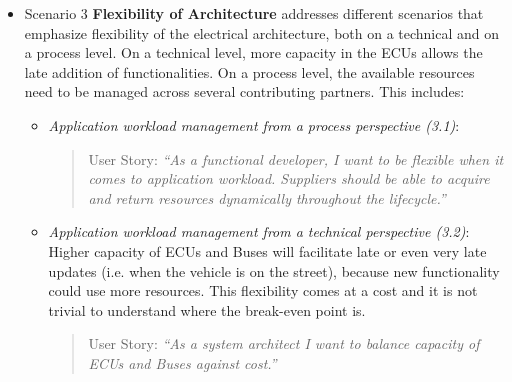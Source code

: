 \begin{itemize}
\begin{itemize}

\item {\em The danger of architecture and design  evolving in different directions (2.2)}: If not actively managed,  architecture and design diverge over time. 
The architecture is then perceived as outdated and not useful, thus it looses its ability to guide design decisions and implementation.

\begin{quote}
{User Story:} 
\emph{``As a system architect or function developer I want a stringent correlation between architecture and design. Otherwise, one or the other is wrong.''}
\end{quote}
\end{itemize}

\item Scenario 3 {\bf Flexibility of Architecture} addresses different scenarios that emphasize flexibility of the electrical architecture, both on a technical and on a process level. On a technical level, more capacity in the ECUs allows the late addition of functionalities. %
On a process level, the available resources need to be managed across several contributing partners.
This includes:

\begin{itemize}
\item {\em Application workload management from a process perspective (3.1)}: 
\begin{quote}
{User Story:} 
\emph{``As a functional developer, I want to be flexible when it comes to application workload. 
Suppliers should be able to acquire and return resources dynamically throughout the lifecycle.''}
\end{quote}

\item {\em Application workload management from a technical perspective (3.2)}: Higher capacity of ECUs and Buses will facilitate late or even very late updates (i.e. when the vehicle is on the street), because new functionality could use more resources.
This flexibility comes at a cost and it is not trivial to understand where the break-even point is.

\begin{quote}
{User Story:} 
\emph{``As a system architect I want to balance capacity of ECUs and Buses against cost.''}
\end{quote}


\end{itemize}
\end{itemize}

